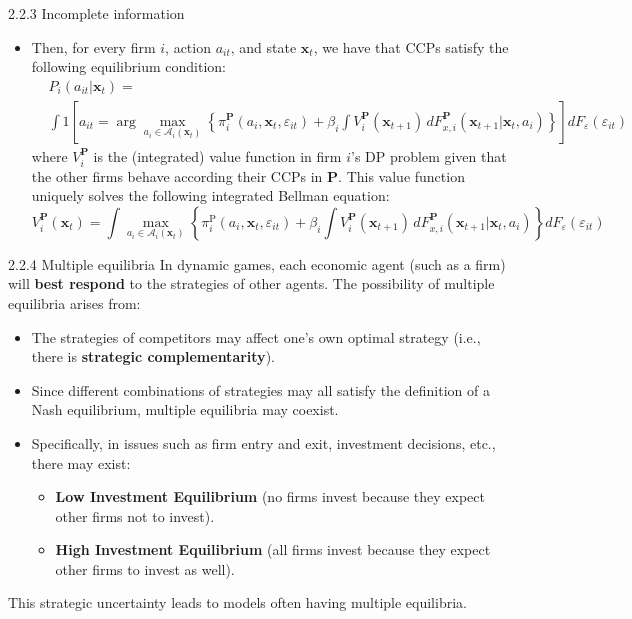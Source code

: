 \documentclass[aspectratio=169]{beamer}  %
\begin{document}
\begin{frame}
{2.2.3 Incomplete information}
    \begin{itemize}
        \item Then, for every firm \(i\), action $a_{it}$, and state $\mathbf{x}_t$, we have that CCPs satisfy the following equilibrium condition:
        \begin{equation}\label{6}
            \begin{split}
            &P_i(a_{it}|\mathbf{x}_t) = \\
            &\int 1 \left[ a_{it} = \arg \max_{a_i \in \mathcal{A}_i(\mathbf{x}_t)} \left\{ \pi_i^\mathbf{P}(a_i, \mathbf{x}_t, \varepsilon_{it}) + \beta_i \int V_i^\mathbf{P}(\mathbf{x}_{t+1}) \, dF_{x,i}^\mathbf{P}(\mathbf{x}_{t+1}|\mathbf{x}_t, a_i) \right\} \right] dF_\varepsilon(\varepsilon_{it})
            \end{split}
        \end{equation}
        where $V_i^\mathbf{P}$ is the (integrated) value function in firm \(i\)’s DP problem given that the other firms behave according their CCPs in $\mathbf{P}$. This value function uniquely solves the following integrated Bellman equation:
        \begin{equation}\label{7}
            V_i^\mathbf{P}(\mathbf{x}_t) = \int \max_{a_i \in \mathcal{A}_i(\mathbf{x}_t)} \left\{ \pi_i^\text{P}(a_i, \mathbf{x}_t, \varepsilon_{it}) + \beta_i \int V_i^\mathbf{P}(\mathbf{x}_{t+1}) \, dF_{x,i}^\mathbf{P}(\mathbf{x}_{t+1}|\mathbf{x}_t, a_i) \right\} dF_\varepsilon(\varepsilon_{it})
        \end{equation}

    \end{itemize}
\end{frame}


\begin{frame}{2.2.4 Multiple equilibria}
In dynamic games, each economic agent (such as a firm) will \textbf{best respond} to the strategies of other agents. The possibility of multiple equilibria arises from:
    \begin{itemize}
        \item The strategies of competitors may affect one's own optimal strategy (i.e., there is \textbf{strategic complementarity}).
        \item Since different combinations of strategies may all satisfy the definition of a Nash equilibrium, multiple equilibria may coexist.
        \item Specifically, in issues such as firm entry and exit, investment decisions, etc., there may exist:
        \begin{itemize}
            \item \textbf{Low Investment Equilibrium} (no firms invest because they expect other firms not to invest).
            \item \textbf{High Investment Equilibrium} (all firms invest because they expect other firms to invest as well).
        \end{itemize}
    \end{itemize}
This strategic uncertainty leads to models often having multiple equilibria.
\end{frame}
\end{document}
